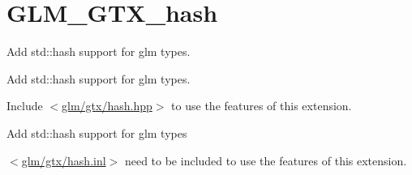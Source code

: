 \hypertarget{group__gtx__hash}{}\section{G\+L\+M\+\_\+\+G\+T\+X\+\_\+hash}
\label{group__gtx__hash}


Add std\+::hash support for glm types.  


Add std\+::hash support for glm types. 

Include $<$\hyperlink{hash_8hpp}{glm/gtx/hash.\+hpp}$>$ to use the features of this extension.

Add std\+::hash support for glm types

$<$\hyperlink{hash_8inl}{glm/gtx/hash.\+inl}$>$ need to be included to use the features of this extension. 